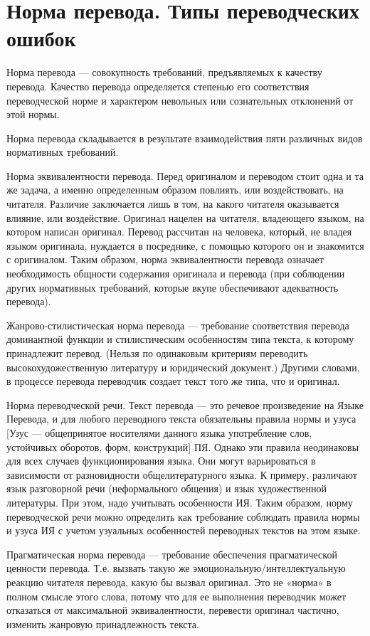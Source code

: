 \section{Норма перевода. Типы переводческих ошибок}

Норма перевода --- совокупность требований, предъявляемых к качеству перевода. Качество перевода определяется степенью его соответствия переводческой норме и характером невольных или сознательных отклонений от этой нормы. 

Норма перевода складывается в результате взаимодействия пяти различных видов нормативных требований. 

Норма эквивалентности перевода. Перед оригиналом и переводом стоит одна и та же задача, а именно определенным образом повлиять, или воздействовать, на читателя. Различие заключается лишь в том, на какого читателя оказывается влияние, или воздействие. Оригинал нацелен на читателя, владеющего языком, на котором написан оригинал. Перевод рассчитан на человека, который, не владея языком оригинала, нуждается в посреднике, с помощью которого он и знакомится с оригиналом. Таким образом, норма эквивалентности перевода означает необходимость общности содержания оригинала и перевода (при соблюдении других нормативных требований, которые вкупе обеспечивают адекватность перевода).

Жанрово-стилистическая норма перевода ---  требование соответствия перевода доминантной функции и стилистическим особенностям типа текста, к которому принадлежит перевод. (Нельзя по одинаковым критериям переводить высокохудожественную литературу и юридический документ.) Другими словами, в процессе перевода переводчик создает текст того же типа, что и оригинал.

Норма переводческой речи. Текст перевода --- это речевое произведение на Языке Перевода, и для любого переводного текста обязательны правила нормы и узуса [Узус --- общепринятое носителями данного языка употребление слов, устойчивых оборотов, форм, конструкций] ПЯ. Однако эти правила неодинаковы для всех случаев функционирования языка. Они могут варьироваться в зависимости от разновидности общелитературного языка. К примеру, различают язык разговорной речи (неформального общения) и язык художественной литературы. При этом, надо учитывать особенности ИЯ. Таким образом, норму переводческой речи можно определить как требование соблюдать правила нормы и узуса ИЯ с учетом узуальных особенностей переводных текстов на этом языке.

Прагматическая норма перевода --- требование обеспечения прагматической ценности перевода. Т.е. вызвать такую же эмоциональную/интеллектуальную реакцию читателя перевода, какую бы вызвал оригинал. Это не «норма» в полном смысле этого слова, потому что для ее выполнения переводчик может отказаться от максимальной эквивалентности, перевести оригинал частично, изменить жанровую принадлежность текста.   

